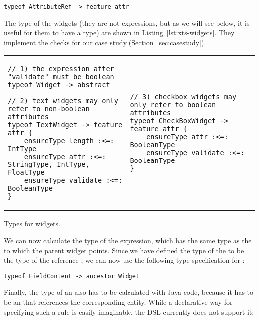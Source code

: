 \begin{lstlisting}[language=xts]
typeof AttributeRef -> feature attr
\end{lstlisting}

The type of the widgets (they are not expressions, but as we will see below, it
is useful for them to have a type) are shown in Listing~\ref{lst:xts-widgets}.
They implement the checks for our case study (Section~\ref{sec:casestudy}).

\begin{listing}[tb]
\begin{tabular}{l@{\hspace{.5cm}}l}
\begin{lstlisting}[language=xts,boxpos=t] 
// 1) the expression after "validate" must be boolean
typeof Widget -> abstract

// 2) text widgets may only refer to non-boolean attributes 
typeof TextWidget -> feature attr {
    ensureType length :<=: IntType
    ensureType attr :<=: StringType, IntType, FloatType
    ensureType validate :<=: BooleanType
}  
\end{lstlisting}
&
\begin{lstlisting}[language=xts,boxpos=t] 
// 3) checkbox widgets may only refer to boolean attributes
typeof CheckBoxWidget -> feature attr {
    ensureType attr :<=: BooleanType
    ensureType validate :<=: BooleanType
}
\end{lstlisting}
\end{tabular}
\vspace{-3.5ex}
\caption{Types for widgets.}
\label{lst:xts-widgets}
\end{listing}

We can now calculate the type of the  expression, which has the
same type as the  to which the parent widget points. Since we have
defined the type of the  to be the type of the reference , we can
now use the following type specification for :

\begin{lstlisting}[language=xts]
typeof FieldContent -> ancestor Widget
\end{lstlisting}

Finally, the type of an  also has to be calculated with Java code, because
it has to be an  that references the corresponding entity. While
a declarative way for specifying such a rule is easily imaginable, the DSL
currently does not support it:

